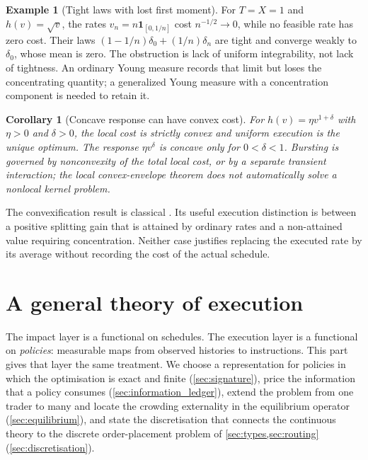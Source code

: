 \documentclass[11pt]{article}
\numberwithin{equation}{section}
\newtheorem{corollary}[theorem]{Corollary}
\theoremstyle{definition}
\theoremstyle{remark}
\theoremstyle{definition}
\newtheorem{example}[theorem]{Example}
\begin{document}
\begin{example}[Tight laws with lost first moment]\label{ex:concentrationlaw}
For $T=X=1$ and $h(v)=\sqrt v$, the rates
$v_n=n\mathbf1_{[0,1/n]}$ cost $n^{-1/2}\to0$, while no feasible rate has
zero cost. Their laws $(1-1/n)\delta_0+(1/n)\delta_n$ are tight and converge
weakly to $\delta_0$, whose mean is zero. The obstruction is lack of uniform
integrability, not lack of tightness. An ordinary Young measure records that
limit but loses the concentrating quantity; a generalized Young measure with
a concentration component is needed to retain it.
\end{example}

\begin{corollary}[Concave response can have convex cost]
For $h(v)=\eta v^{1+\delta}$ with $\eta>0$ and $\delta>0$, the local cost is
strictly convex and uniform execution is the unique optimum. The response
$\eta v^\delta$ is concave only for $0<\delta<1$. Bursting is governed by
nonconvexity of the total local cost, or by a separate transient interaction;
the local convex-envelope theorem does not automatically solve a nonlocal
kernel problem.
\end{corollary}

The convexification result is classical \citep{ekelandtemam1999}. Its useful
execution distinction is between a positive splitting gain that is attained
by ordinary rates and a non-attained value requiring concentration. Neither
case justifies replacing the executed rate by its average without recording
the cost of the actual schedule.

\part{A general theory of execution}\label{pt:generalexec}

The impact layer is a functional on schedules. The execution layer is a
functional on \emph{policies}: measurable maps from observed histories to
instructions. This part gives that layer the same treatment. We choose a
representation for policies in which the optimisation is exact and finite
(\cref{sec:signature}), price the information that a policy consumes
(\cref{sec:information_ledger}), extend the problem from one trader to many and
locate the crowding externality in the equilibrium operator
(\cref{sec:equilibrium}), and state the discretisation that connects the
continuous theory to the discrete order-placement problem of
\cref{sec:types,sec:routing} (\cref{sec:discretisation}).
\end{document}

